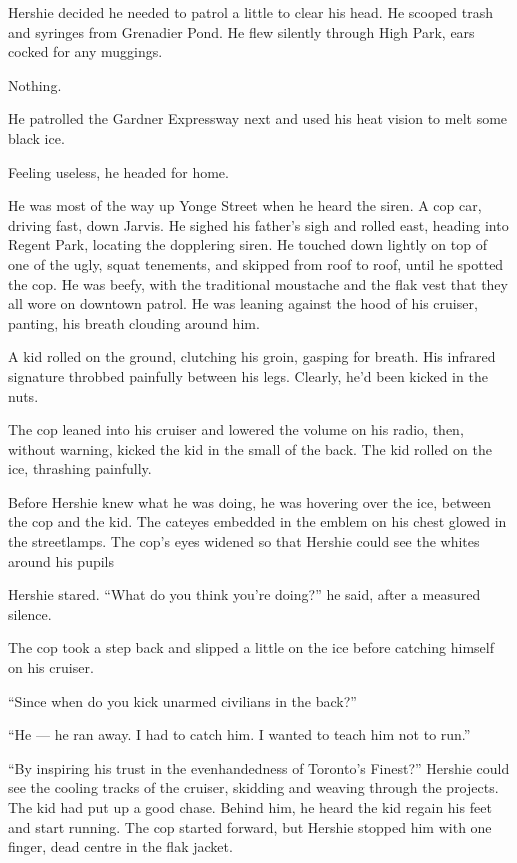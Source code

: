 Hershie decided he needed to patrol a little to clear his head. He
scooped trash and syringes from Grenadier Pond. He flew silently
through High Park, ears cocked for any muggings.

Nothing.

He patrolled the Gardner Expressway next and used his heat vision
to melt some black ice.

Feeling useless, he headed for home.

He was most of the way up Yonge Street when he heard the siren. A
cop car, driving fast, down Jarvis. He sighed his father's sigh and
rolled east, heading into Regent Park, locating the dopplering
siren. He touched down lightly on top of one of the ugly, squat
tenements, and skipped from roof to roof, until he spotted the cop.
He was beefy, with the traditional moustache and the flak vest that
they all wore on downtown patrol. He was leaning against the hood
of his cruiser, panting, his breath clouding around him.

A kid rolled on the ground, clutching his groin, gasping for
breath. His infrared signature throbbed painfully between his legs.
Clearly, he'd been kicked in the nuts.

The cop leaned into his cruiser and lowered the volume on his
radio, then, without warning, kicked the kid in the small of the
back. The kid rolled on the ice, thrashing painfully.

Before Hershie knew what he was doing, he was hovering over the
ice, between the cop and the kid. The cateyes embedded in the
emblem on his chest glowed in the streetlamps. The cop's eyes
widened so that Hershie could see the whites around his pupils

Hershie stared. ``What do you think you're doing?'' he said, after
a measured silence.

The cop took a step back and slipped a little on the ice before
catching himself on his cruiser.

``Since when do you kick unarmed civilians in the back?''

``He --- he ran away. I had to catch him. I wanted to teach him not to run.''

``By inspiring his trust in the evenhandedness of Toronto's Finest?''
Hershie could see the cooling tracks of the cruiser, skidding and
weaving through the projects. The kid had put up a good chase.
Behind him, he heard the kid regain his feet and start running. The
cop started forward, but Hershie stopped him with one finger, dead
centre in the flak jacket.

